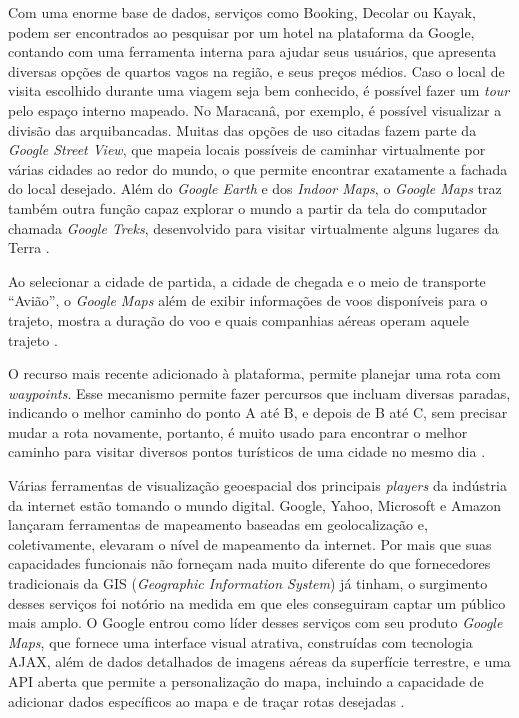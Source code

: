 Com uma enorme base de dados, serviços como Booking, Decolar ou Kayak, podem ser encontrados ao pesquisar por um hotel na plataforma da Google, contando com uma ferramenta interna para ajudar seus usuários, que apresenta diversas opções de quartos vagos na região, e seus preços médios. Caso o local de visita escolhido durante uma viagem seja bem conhecido, é possível fazer um \textit{tour} pelo espaço interno mapeado. No Maracanâ, por exemplo, é possível visualizar a divisão das arquibancadas. Muitas das opções de uso citadas fazem parte da \textit{Google Street View}, que mapeia locais possíveis de caminhar virtualmente por várias cidades ao redor do mundo, o que permite encontrar exatamente a fachada do local desejado. Além do \textit{Google Earth} e dos \textit{Indoor Maps}, o \textit{Google Maps} traz também outra função capaz explorar o mundo a partir da tela do computador chamada \textit{Google Treks}, desenvolvido para visitar virtualmente alguns lugares da Terra \cite{google:2019}.

Ao selecionar a cidade de partida, a cidade de chegada e o meio de transporte “Avião”, o \textit{Google Maps} além de exibir informações de voos disponíveis para o trajeto, mostra a duração do voo e quais companhias aéreas operam aquele trajeto \cite{google:2019}. 

O recurso mais recente adicionado à plataforma, permite planejar uma rota com \textit{waypoints}. Esse mecanismo permite fazer percursos que incluam diversas paradas, indicando o melhor caminho do ponto A até B, e depois de B até C, sem precisar mudar a rota novamente, portanto, é muito usado para encontrar o melhor caminho para visitar diversos pontos turísticos de uma cidade no mesmo dia \cite{google:2019}.

Várias ferramentas de visualização geoespacial dos principais \textit{players} da indústria da internet estão tomando o mundo digital. Google, Yahoo, Microsoft e Amazon lançaram ferramentas de mapeamento baseadas em geolocalização e, coletivamente, elevaram o nível de mapeamento da internet. Por mais que suas capacidades funcionais não forneçam nada muito diferente do que fornecedores tradicionais da GIS (\textit{Geographic Information System}) já tinham, o surgimento desses serviços foi notório na medida em que eles conseguiram captar um público mais amplo. O Google entrou como líder desses serviços com seu produto \textit{Google Maps}, que fornece uma interface visual atrativa, construídas com tecnologia AJAX, além de dados detalhados de imagens aéreas da superfície terrestre, e uma API aberta que permite a personalização do mapa, incluindo a capacidade de adicionar dados específicos ao mapa e de traçar rotas desejadas \cite{geospatial:2009}.

